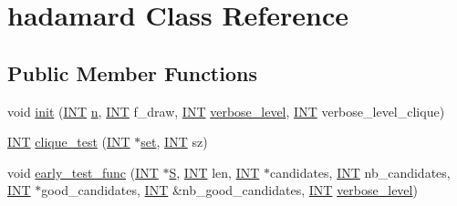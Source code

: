 \hypertarget{classhadamard}{}\section{hadamard Class Reference}
\label{classhadamard}
\subsection*{Public Member Functions}
\begin{DoxyCompactItemize}
\item 
void \mbox{\hyperlink{classhadamard_a16af359850b8bdd0d2a73e260d496c33}{init}} (\mbox{\hyperlink{galois_8h_a09fddde158a3a20bd2dcadb609de11dc}{I\+NT}} \mbox{\hyperlink{classhadamard_aaa7087a44d86f99804f4a42581f2a842}{n}}, \mbox{\hyperlink{galois_8h_a09fddde158a3a20bd2dcadb609de11dc}{I\+NT}} f\+\_\+draw, \mbox{\hyperlink{galois_8h_a09fddde158a3a20bd2dcadb609de11dc}{I\+NT}} \mbox{\hyperlink{simeon_8_c_a818073fbcc2f439e7c56952f67386122}{verbose\+\_\+level}}, \mbox{\hyperlink{galois_8h_a09fddde158a3a20bd2dcadb609de11dc}{I\+NT}} verbose\+\_\+level\+\_\+clique)
\item 
\mbox{\hyperlink{galois_8h_a09fddde158a3a20bd2dcadb609de11dc}{I\+NT}} \mbox{\hyperlink{classhadamard_a2f9f095c9f78d125e764354279820fd5}{clique\+\_\+test}} (\mbox{\hyperlink{galois_8h_a09fddde158a3a20bd2dcadb609de11dc}{I\+NT}} $\ast$\mbox{\hyperlink{nauty_8h_a9690bea211101f22a5e154087590c3da}{set}}, \mbox{\hyperlink{galois_8h_a09fddde158a3a20bd2dcadb609de11dc}{I\+NT}} sz)
\item 
void \mbox{\hyperlink{classhadamard_a299a7a683de28326c93c8fd5b9545144}{early\+\_\+test\+\_\+func}} (\mbox{\hyperlink{galois_8h_a09fddde158a3a20bd2dcadb609de11dc}{I\+NT}} $\ast$\mbox{\hyperlink{simeon_8_c_adab47f8243f1b5a2c31df2535d6b37d0}{S}}, \mbox{\hyperlink{galois_8h_a09fddde158a3a20bd2dcadb609de11dc}{I\+NT}} len, \mbox{\hyperlink{galois_8h_a09fddde158a3a20bd2dcadb609de11dc}{I\+NT}} $\ast$candidates, \mbox{\hyperlink{galois_8h_a09fddde158a3a20bd2dcadb609de11dc}{I\+NT}} nb\+\_\+candidates, \mbox{\hyperlink{galois_8h_a09fddde158a3a20bd2dcadb609de11dc}{I\+NT}} $\ast$good\+\_\+candidates, \mbox{\hyperlink{galois_8h_a09fddde158a3a20bd2dcadb609de11dc}{I\+NT}} \&nb\+\_\+good\+\_\+candidates, \mbox{\hyperlink{galois_8h_a09fddde158a3a20bd2dcadb609de11dc}{I\+NT}} \mbox{\hyperlink{simeon_8_c_a818073fbcc2f439e7c56952f67386122}{verbose\+\_\+level}})
\end{DoxyCompactItemize}
